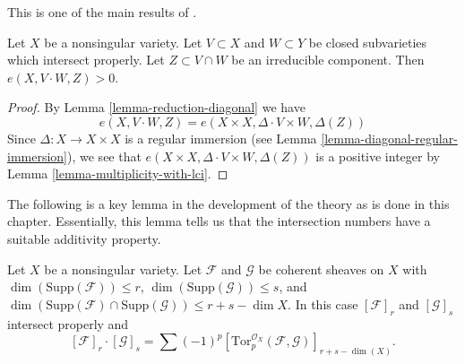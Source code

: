 \begin{proposition}
\label{proposition-positivity}
\begin{reference}
This is one of the main results of \cite{Serre_algebre_locale}.
\end{reference}
Let $X$ be a nonsingular variety. Let $V \subset X$ and
$W \subset Y$ be closed subvarieties which intersect properly.
Let $Z \subset V \cap W$ be an irreducible component.
Then $e(X, V \cdot W, Z) > 0$.
\end{proposition}

\begin{proof}
By Lemma \ref{lemma-reduction-diagonal} we have
$$
e(X, V \cdot W, Z) = e(X \times X, \Delta \cdot V \times W, \Delta(Z))
$$
Since $\Delta : X \to X \times X$ is a regular immersion
(see Lemma \ref{lemma-diagonal-regular-immersion}), we see that
$e(X \times X, \Delta \cdot V \times W, \Delta(Z))$ is a positive
integer by Lemma \ref{lemma-multiplicity-with-lci}.
\end{proof}

\noindent
The following is a key lemma in the development of the theory as
is done in this chapter. Essentially, this lemma tells us that
the intersection numbers have a suitable additivity property.

\begin{lemma}
\label{lemma-tor-sheaf}
\begin{reference}
\cite[Chapter V]{Serre_algebre_locale}
\end{reference}
Let $X$ be a nonsingular variety. Let $\mathcal{F}$ and
$\mathcal{G}$ be coherent sheaves on $X$ with
$\dim(\text{Supp}(\mathcal{F})) \leq r$,
$\dim(\text{Supp}(\mathcal{G})) \leq s$, and
$\dim(\text{Supp}(\mathcal{F}) \cap \text{Supp}(\mathcal{G}) )
\leq r + s - \dim X$. In this case $[\mathcal{F}]_r$ and $[\mathcal{G}]_s$
intersect properly and
$$
[\mathcal{F}]_r \cdot [\mathcal{G}]_s =
\sum (-1)^p
[\text{Tor}_p^{\mathcal{O}_X}(\mathcal{F}, \mathcal{G})]_{r + s - \dim(X)}.
$$
\end{lemma}

